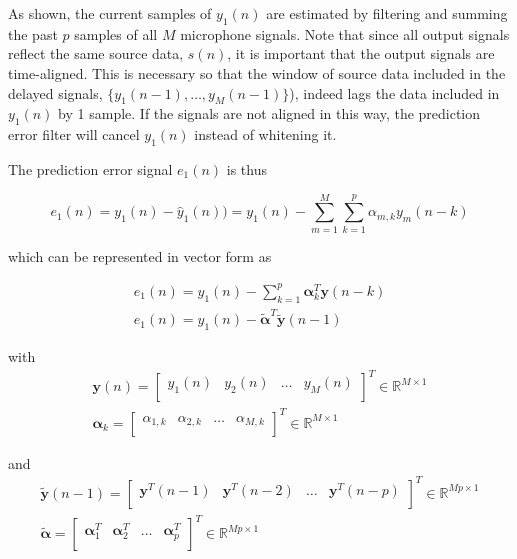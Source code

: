 As shown, the current samples of $y_1(n)$ are estimated by filtering and summing the past $p$ samples of all $M$ microphone signals. Note that since all output signals reflect the same source data, $s(n)$, it is important that the output signals are time-aligned. This is necessary so that the window of source data included in the delayed signals, $\{y_1(n-1), \dots, y_M(n-1)\}$), indeed lags the data included in $y_1(n)$ by 1 sample. If the signals are not aligned in this way, the prediction error filter will cancel $y_1(n)$ instead of whitening it.

The prediction error signal $e_1(n)$ is thus

\noindent
\begin{equation}
	e_1(n) = y_1(n) - \hat{y}_1(n)) = y_1(n) -\sum_{m=1}^{M} \sum_{k=1}^{p} \alpha_{m,k} y_m(n-k) \label{eq:mc_lp_error}
\end{equation}

\noindent
which can be represented in vector form as

\begin{eqnarray}
	e_1(n)=y_1(n) - \sum_{k=1}^{p} \boldsymbol{\alpha}_k^T \boldsymbol{y}(n-k) \\
	e_1(n) = y_1(n) - \boldsymbol{\tilde{\alpha}}^T \boldsymbol{\tilde{y}}(n-1) \label{eq:mc_lp_error_vec}
\end{eqnarray}

\noindent
with
\begin{eqnarray}
	\boldsymbol{y}(n) = 
	\begin{bmatrix}
		y_1(n) &	y_2(n)  & \dots  & y_M(n)  \\
	\end{bmatrix}^T  \in  \mathbb{R} ^ {M \times 1} \\
	\boldsymbol{\alpha}_k = 
	\begin{bmatrix}
		\alpha_{1,k} &	\alpha_{2,k} & \dots  & \alpha_{M,k} \\
	\end{bmatrix}^T  \in  \mathbb{R} ^ {M \times 1}
\end{eqnarray}

\noindent
and
\begin{eqnarray}
	\boldsymbol{\tilde{y}}(n-1) = 
	\begin{bmatrix}
		\boldsymbol{y}^T(n-1) &	\boldsymbol{y}^T(n-2)  & \dots  & \boldsymbol{y}^T(n-p)   \\
	\end{bmatrix}^T  \in  \mathbb{R} ^ {Mp \times 1}\\
	\boldsymbol{\tilde{\alpha}} = 
	\begin{bmatrix}
		\boldsymbol{\alpha}^T_1 &	\boldsymbol{\alpha}^T_2  & \dots  & \boldsymbol{\alpha}^T_p \\
	\end{bmatrix}^T  \in  \mathbb{R} ^ {Mp \times 1}
\end{eqnarray}


